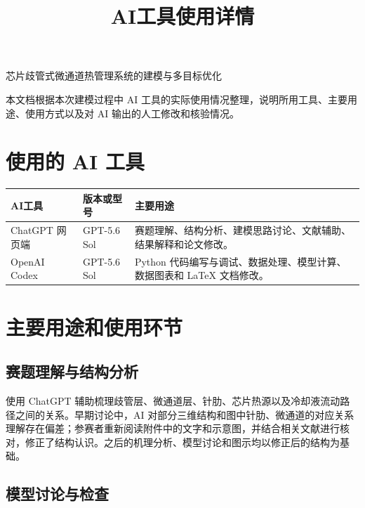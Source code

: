 \documentclass[UTF8,a4paper,11pt]{ctexart}
\title{\vspace{-1.2cm}\textbf{AI工具使用详情}}
\author{}
\date{}
\begin{document}
\maketitle
\vspace{-1.2cm}
\begin{center}
  \large 芯片歧管式微通道热管理系统的建模与多目标优化
\end{center}
\vspace{0.35em}

本文档根据本次建模过程中 AI 工具的实际使用情况整理，说明所用工具、主要用途、使用方式以及对 AI 输出的人工修改和核验情况。

\section{使用的 AI 工具}

\begin{table}[htbp]
\centering
\small
\begin{tabularx}{\textwidth}{L{2.6cm} L{4.1cm} Y}
\toprule
\textbf{AI工具} & \textbf{版本或型号} & \textbf{主要用途} \\
\midrule
ChatGPT 网页端 & GPT-5.6 Sol & 赛题理解、结构分析、建模思路讨论、文献辅助、结果解释和论文修改。 \\
OpenAI Codex & GPT-5.6 Sol & Python 代码编写与调试、数据处理、模型计算、数据图表和 \LaTeX{} 文档修改。 \\
\bottomrule
\end{tabularx}
\end{table}

\section{主要用途和使用环节}

\subsection{赛题理解与结构分析}

使用 ChatGPT 辅助梳理歧管层、微通道层、针肋、芯片热源以及冷却液流动路径之间的关系。早期讨论中，AI 对部分三维结构和图中针肋、微通道的对应关系理解存在偏差；参赛者重新阅读附件中的文字和示意图，并结合相关文献进行核对，修正了结构认识。之后的机理分析、模型讨论和图示均以修正后的结构为基础。

\subsection{模型讨论与检查}
\end{document}
